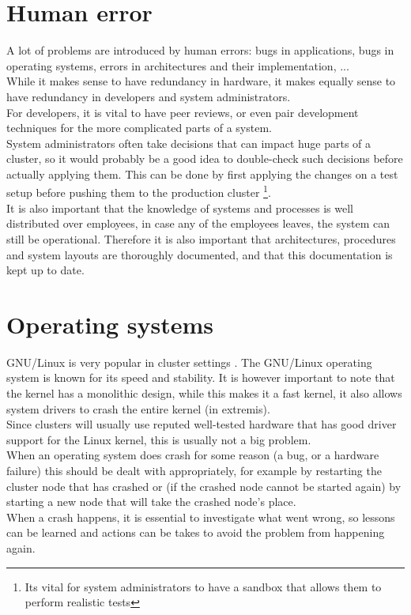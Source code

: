 \documentclass[12pt]{report}
\begin{document}
\section{Human error}
A lot of problems are introduced by human errors: bugs in
applications, bugs in operating systems, errors in architectures and
their implementation, ...\\
While it makes sense to have redundancy in hardware, it makes equally
sense to have redundancy in developers and system administrators.\\
For developers, it is vital to have peer reviews, or even pair
development techniques for the more complicated parts of a system.\\
System administrators often take decisions that can impact huge parts
of a cluster, so it would probably be a good idea to double-check such
decisions before actually applying them. This can be done by first
applying the changes on a test setup before pushing them to the
production cluster \footnote{Its vital for system administrators to
  have a sandbox that allows them to perform realistic tests}.\\
It is also important that the knowledge of systems and processes is
well distributed over employees, in case any of the employees leaves,
the system can still be operational. Therefore it is also important
that architectures, procedures and system layouts are thoroughly
documented, and that this documentation is kept up to date. 

\section{Operating systems}
GNU/Linux is very popular in cluster settings
\cite{server_market_share}.
The GNU/Linux operating system is known for its speed and stability.
It is however important to note that the kernel has a monolithic
design, while this makes it a fast kernel, it also allows system drivers
to crash the entire kernel (in extremis). \\
Since clusters will usually use reputed well-tested hardware that has
good driver support for the Linux kernel, this is usually not  a big
problem.\\
When an operating system does crash for some reason (a bug, or a
hardware failure) this should be dealt with appropriately, for example
by restarting the cluster node that has crashed or (if the crashed
node cannot be started again) by starting a new node that will take
the crashed node's place.\\
When a crash happens, it is essential to investigate what went wrong,
so lessons can be learned and actions can be takes to avoid the
problem from happening again.
\end{document}
